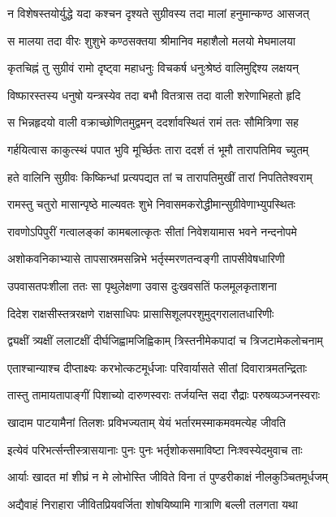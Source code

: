 \twolineshloka
{न विशेषस्तयोर्युद्धे यदा कश्चन दृश्यते}
{सुग्रीवस्य तदा मालां हनुमान्कण्ठ आसजत्}


\twolineshloka
{स मालया तदा वीरः शुशुभे कण्ठसक्तया}
{श्रीमानिव महाशैलो मलयो मेघमालया}


\twolineshloka
{कृतचिह्नं तु सुग्रीवं रामो दृष्ट्वा महाधनुः}
{विचकर्ष धनुःश्रेष्ठं वालिमुद्दिश्य लक्षयन्}


\twolineshloka
{विष्फारस्तस्य धनुषो यन्त्रस्येव तदा बभौ}
{वितत्रास तदा वाली शरेणाभिहतो हृदि}


\twolineshloka
{स भिन्नहृदयो वाली वक्राच्छोणितमुद्वमन्}
{ददर्शावस्थितं रामं ततः सौमित्रिणा सह}


\twolineshloka
{गर्हयित्वास काकुत्स्थं पपात भुवि मूर्च्छितः}
{तारा ददर्श तं भूमौ तारापतिमिव च्युतम्}


\twolineshloka
{हते वालिनि सुग्रीवः किष्किन्धां प्रत्यपद्यत}
{तां च तारापतिमुखीं तारां निपतितेश्वराम्}


\twolineshloka
{रामस्तु चतुरो मासान्पृष्ठे माल्यवतः शुभे}
{निवासमकरोद्धीमान्सुग्रीवेणाभ्युपस्थितः}


\twolineshloka
{रावणोऽपिपुरीं गत्वालङ्कां कामबलात्कृतः}
{सीतां निवेशयामास भवने नन्दनोपमे}


\twolineshloka
{अशोकवनिकाभ्यासे तापसास्रमसन्निभे}
{भर्तृस्मरणतन्वङ्गी तापसीवेषधारिणी}


\twolineshloka
{उपवासतपःशीला ततः सा पृथुलेक्षणा}
{उवास दुःखवसतिं फलमूलकृताशना}


\twolineshloka
{दिदेश राक्षसीस्तत्ररक्षणे राक्षसाधिपः}
{प्रासासिशूलपरशुमुद्गरालातधारिणीः}


\twolineshloka
{द्व्यक्षीं त्र्यक्षीं ललाटक्षीं दीर्घजिह्वामजिह्विकाम्}
{त्रिस्तनीमेकपादां च त्रिजटामेकलोचनाम्}


\twolineshloka
{एताश्चान्याश्च दीप्ताक्ष्यः करभोत्कटमूर्धजाः}
{परिवार्यासते सीतां दिवारात्रमतन्द्रिताः}


\twolineshloka
{तास्तु तामायतापाङ्गीं पिशाच्यो दारुणस्वराः}
{तर्जयन्ति सदा रौद्राः परुषव्यञ्जनस्वराः}


\twolineshloka
{खादाम पाटयामैनां तिलशः प्रविभज्यताम्}
{येयं भर्तारमस्माकमवमत्येह जीवति}


\twolineshloka
{इत्येवं परिभर्त्सन्तीस्त्रासयानाः पुनः पुनः}
{भर्तृशोकसमाविष्टा निःश्वस्येदमुवाच ताः}


\twolineshloka
{आर्याः खादत मां शीघ्रं न मे लोभोस्ति जीविते}
{विना तं पुण्डरीकाक्षं नीलकुञ्चितमूर्धजम्}


\twolineshloka
{अद्यैवाहं निराहारा जीवितप्रियवर्जिता}
{शोषयिष्यामि गात्राणि बल्ली तलगता यथा}


